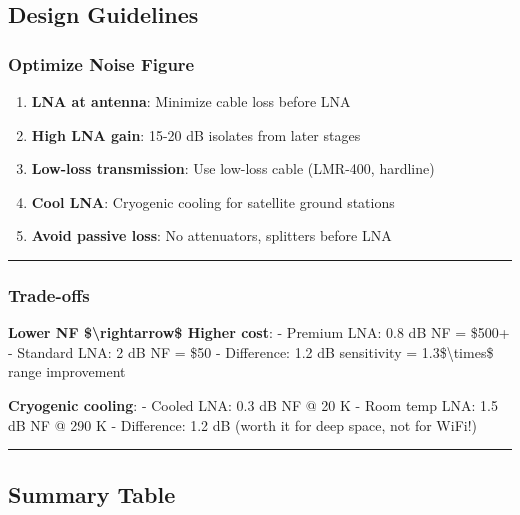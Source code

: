 \subsection{Design Guidelines}\label{design-guidelines}

\subsubsection{Optimize Noise Figure}\label{optimize-noise-figure}

\begin{enumerate}
\def\labelenumi{\arabic{enumi}.}
\tightlist
\item
  \textbf{LNA at antenna}: Minimize cable loss before LNA
\item
  \textbf{High LNA gain}: 15-20 dB isolates from later stages
\item
  \textbf{Low-loss transmission}: Use low-loss cable (LMR-400, hardline)
\item
  \textbf{Cool LNA}: Cryogenic cooling for satellite ground stations
\item
  \textbf{Avoid passive loss}: No attenuators, splitters before LNA
\end{enumerate}

\begin{center}\rule{0.5\linewidth}{0.5pt}\end{center}

\subsubsection{Trade-offs}\label{trade-offs}

\textbf{Lower NF \$\textbackslash rightarrow\$ Higher cost}: - Premium
LNA: 0.8 dB NF = \$500+ - Standard LNA: 2 dB NF = \$50 - Difference: 1.2
dB sensitivity = 1.3\$\textbackslash times\$ range improvement

\textbf{Cryogenic cooling}: - Cooled LNA: 0.3 dB NF @ 20 K - Room temp
LNA: 1.5 dB NF @ 290 K - Difference: 1.2 dB (worth it for deep space,
not for WiFi!)

\begin{center}\rule{0.5\linewidth}{0.5pt}\end{center}

\subsection{Summary Table}\label{summary-table}

